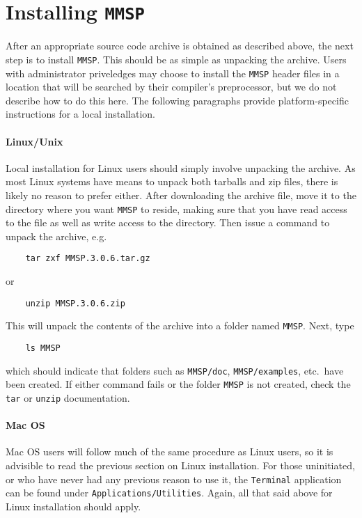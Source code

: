 \section{Installing {\tt MMSP}}
After an appropriate source code archive is obtained as described above, the next step is to install {\tt MMSP}.  This should be as simple as unpacking the archive.  Users with administrator priveledges may choose to install the {\tt MMSP} header files in a location that will be searched by their compiler's preprocessor, but we do not describe how to do this here.  The following paragraphs provide platform-specific instructions for a local installation.

\paragraph{Linux/Unix}
Local installation for Linux users should simply involve unpacking the archive.  As most Linux systems have means to unpack both tarballs and zip files, there is likely no reason to prefer either.  After downloading the archive file, move it to the directory where you want {\tt MMSP} to reside, making sure that you have read access to the file as well as write access to the directory.  Then issue a command to unpack the archive, e.g.
\begin{shadebox}
\begin{verbatim}
    tar zxf MMSP.3.0.6.tar.gz
\end{verbatim}
\end{shadebox}
or
\begin{shadebox}
\begin{verbatim}
    unzip MMSP.3.0.6.zip
\end{verbatim}
\end{shadebox}
This will unpack the contents of the archive into a folder named {\tt MMSP}.  Next, type
\begin{shadebox}
\begin{verbatim}
    ls MMSP
\end{verbatim}
\end{shadebox}
which should indicate that folders such as {\tt MMSP/doc}, {\tt MMSP/examples}, etc.~have been created.  If either command fails or the folder {\tt MMSP} is not created, check the {\tt tar} or {\tt unzip} documentation.

\paragraph{Mac OS}
Mac OS users will follow much of the same procedure as Linux users, so it is advisible to read the previous section on Linux installation.  For those uninitiated, or who have never had any previous reason to use it, the {\tt Terminal} application can be found under {\tt Applications/Utilities}.  Again, all that said above for Linux installation should apply.

